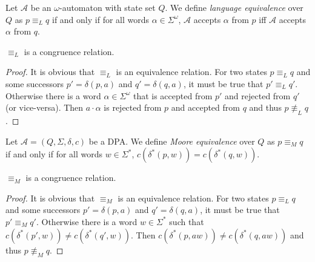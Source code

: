 \begin{defn}
	Let $\mathcal{A}$ be an $\omega$-automaton with state set $Q$. We define \emph{language equivalence} over $Q$ as $p \equiv_L q$ if and only if for all words $\alpha \in \Sigma^\omega$, $\mathcal{A}$ accepts $\alpha$ from $p$ iff $\mathcal{A}$ accepts $\alpha$ from $q$.
\end{defn}


\begin{lem}
	$\equiv_L$ is a congruence relation.
\end{lem}

\begin{proof}
	It is obvious that $\equiv_L$ is an equivalence relation. For two states $p \equiv_L q$ and some successors $p' = \delta(p, a)$ and $q' = \delta(q, a)$, it must be true that $p' \equiv_L q'$. Otherwise there is a word $\alpha \in \Sigma^\omega$ that is accepted from $p'$ and rejected from $q'$ (or vice-versa). Then $a \cdot \alpha$ is rejected from $p$ and accepted from $q$ and thus $p \not\equiv_L q$.
\end{proof}


\begin{defn}
	Let $\mathcal{A} = (Q, \Sigma, \delta, c)$ be a DPA. We define \emph{Moore equivalence} over $Q$ as $p \equiv_M q$ if and only if for all words $w \in \Sigma^*$, $c(\delta^*(p, w)) = c(\delta^*(q, w))$.
\end{defn}


\begin{lem}
	$\equiv_M$ is a congruence relation.
\end{lem}

\begin{proof}
	It is obvious that $\equiv_M$ is an equivalence relation. For two states $p \equiv_L q$ and some successors $p' = \delta(p, a)$ and $q' = \delta(q, a)$, it must be true that $p' \equiv_M q'$. Otherwise there is a word $w \in \Sigma^*$ such that $c(\delta^*(p', w)) \neq c(\delta^*(q', w))$. Then $c(\delta^*(p, aw)) \neq c(\delta^*(q, aw))$ and thus $p \not\equiv_M q$.
\end{proof}